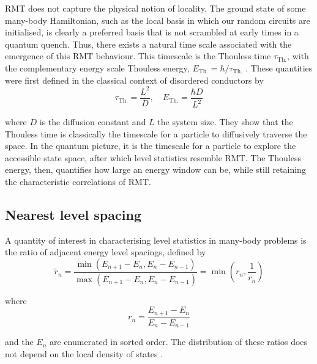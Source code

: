 \documentclass[10pt]{article}
\begin{document}
RMT does not capture the physical notion of locality. The ground state of some many-body Hamiltonian, such as the local basis in which our random circuits are initialised, is clearly a preferred basis that is not scrambled at early times in a quantum quench. Thus, there exists a natural time scale associated with the emergence of this RMT behaviour. This timescale is the Thouless time $\tau_\text{Th.}$, with the complementary energy scale Thouless energy, $E_\text{Th.} = \hbar / \tau_\text{Th.}$ \cite{chan2018solution, bertini2018exact}. These quantities were first defined in the classical context of disordered conductors by
\begin{equation}
\tau_\text{Th.} = \frac{L^2}{D},
\quad
E_\text{Th.} = \frac{\hbar D}{L^2}
\end{equation}

where $D$ is the diffusion constant and $L$ the system size. They show that the Thouless time is classically the timescale for a particle to diffusively traverse the space. In the quantum picture, it is the timescale for a particle to explore the accessible state space, after which level statistics resemble RMT. The Thouless energy, then, quantifies how large an energy window can be, while still retaining the characteristic correlations of RMT. 


\subsection{Nearest level spacing}

A quantity of interest in characterising level statistics in many-body problems is the ratio of adjacent energy level spacings, defined by \cite{oganesyan2007localization}
\begin{equation}
\tilde{r}_n 
= \frac{\min(E_{n+1} - E_n, E_n - E_{n-1})}{\max(E_{n+1} - E_n, E_n - E_{n-1})} 
= \min\left(r_n, \frac{1}{r_n}\right)
\end{equation}

where 
\begin{equation}
r_n = \frac{E_{n+1} - E_n}{E_n - E_{n-1}}
\end{equation}

and the $E_n$ are enumerated in sorted order. The distribution of these ratios does not depend on the local density of states \cite{atas2013distribution}. 
\end{document}
